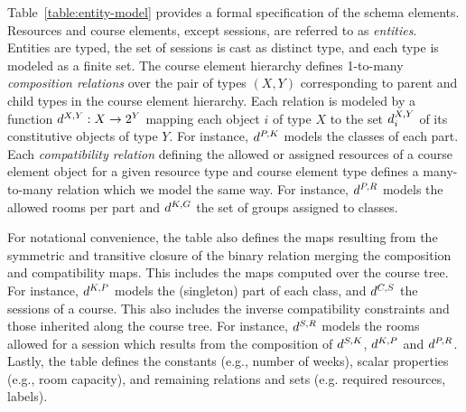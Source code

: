 \documentclass[runningheads]{llncs}
\begin{document}
 Table~\ref{table:entity-model} provides a formal specification of the schema elements.
Resources and course elements, except sessions, are referred to as \textit{entities}.
Entities are typed,
the set of sessions is cast as distinct type, 
and each type is modeled as a finite set.
The course element hierarchy
defines 1-to-many \textit{composition relations} over the pair of types
$(X,Y)$ corresponding to parent and child types
in the course element hierarchy. 
Each relation is modeled by a function ${d^{X,Y}}:X\rightarrow2^{Y}$
mapping each object $i$ of type $X$
to the set ${d^{X,Y}_{i}}$ of its constitutive objects of type $Y$.
For instance, 
${d^{P,K}}$ 
models the classes of each part.
Each \textit{compatibility relation}
defining the allowed or assigned resources of a course element object
for a given resource type and course element type
defines a many-to-many relation
which we model the same way.
For instance, 
${d^{P,R}}$
models the allowed rooms per part
and ${d^{K,G}}$
the set of groups assigned to classes.

For notational convenience, 
the table also defines 
the maps resulting from 
the symmetric and transitive closure of the binary relation merging the composition and compatibility maps.
This includes
the maps
computed over the course tree.
For instance, 
${d^{K,P}}$ 
models the (singleton) part of each class,
and ${d^{C,S}}$ 
the sessions of a course.
This also includes the 
inverse compatibility constraints
and those inherited along the course tree.
For instance, ${d^{S,R}}$ models the rooms allowed for a session
which results from the composition of ${d^{S,K}}$, ${d^{K,P}}$ and ${d^{P,R}}$.
Lastly, the table defines the constants (e.g., number of weeks),
scalar properties
(e.g., room capacity),
and remaining relations and sets (e.g. required resources, labels).
\end{document}

